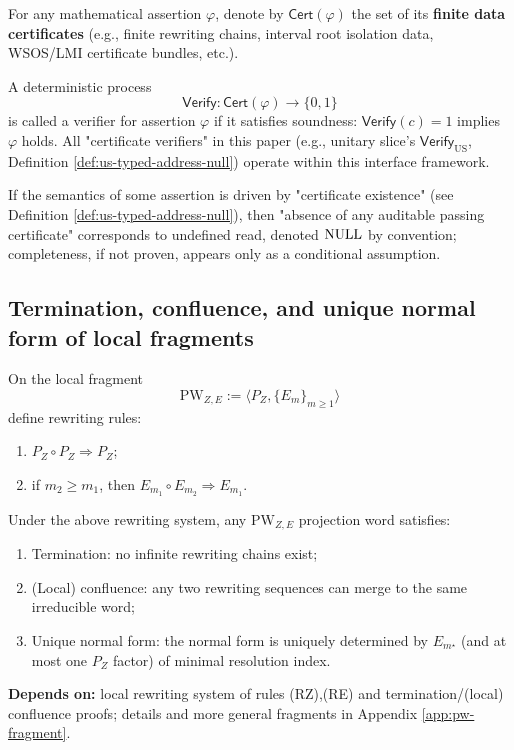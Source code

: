 \begin{definition}\label{def:cert-verify}
For any mathematical assertion $\varphi$, denote by $\mathsf{Cert}(\varphi)$ the set of its \textbf{finite data certificates} (e.g., finite rewriting chains, interval root isolation data, WSOS/LMI certificate bundles, etc.).\par
A deterministic process
$$
\mathsf{Verify}:\mathsf{Cert}(\varphi)\to\{0,1\}
$$
is called a verifier for assertion $\varphi$ if it satisfies soundness: $\mathsf{Verify}(c)=1$ implies $\varphi$ holds. All "certificate verifiers" in this paper (e.g., unitary slice's $\mathsf{Verify}_{\mathrm{US}}$, Definition \ref{def:us-typed-address-null}) operate within this interface framework.\par
If the semantics of some assertion is driven by "certificate existence" (see Definition \ref{def:us-typed-address-null}), then "absence of any auditable passing certificate" corresponds to undefined read, denoted $\mathrm{NULL}$ by convention; completeness, if not proven, appears only as a conditional assumption.\par
\end{definition}

\subsection{Termination, confluence, and unique normal form of local fragments}
On the local fragment
$$
\mathrm{PW}_{Z,E}:=\langle P_Z,\{E_m\}_{m\ge 1}\rangle
$$
define rewriting rules:
\begin{enumerate}
  \item[(RZ)] $P_Z\circ P_Z\Rightarrow P_Z$;
  \item[(RE)] if $m_2\ge m_1$, then $E_{m_1}\circ E_{m_2}\Rightarrow E_{m_1}$.
\end{enumerate}

\begin{theorem}\label{thm:pw-ze-termination-confluence}
Under the above rewriting system, any $\mathrm{PW}_{Z,E}$ projection word satisfies:
\begin{enumerate}
  \item Termination: no infinite rewriting chains exist;
  \item (Local) confluence: any two rewriting sequences can merge to the same irreducible word;
  \item Unique normal form: the normal form is uniquely determined by $E_{m^\star}$ (and at most one $P_Z$ factor) of minimal resolution index.
\end{enumerate}
\par\noindent\textnormal{\textbf{Depends on:} local rewriting system of rules (RZ),(RE) and termination/(local) confluence proofs; details and more general fragments in Appendix \ref{app:pw-fragment}.}\par
\end{theorem}

